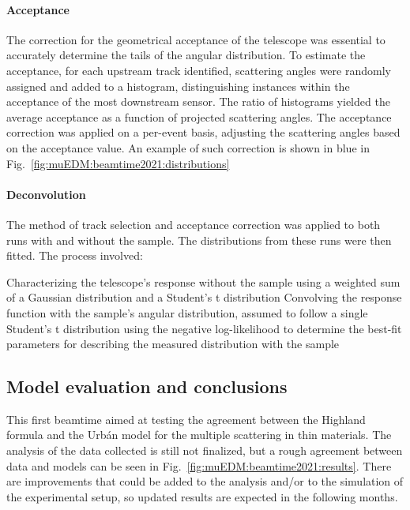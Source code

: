 \begin{refsection}
        \paragraph{Acceptance}
        The correction for the geometrical acceptance of the telescope was essential to accurately determine the tails of the angular distribution.
        To estimate the acceptance, for each upstream track identified, scattering angles were randomly assigned and added to a histogram, distinguishing instances within the acceptance of the most downstream sensor. 
        The ratio of histograms yielded the average acceptance as a function of projected scattering angles. 
        The acceptance correction was applied on a per-event basis, adjusting the scattering angles based on the acceptance value. 
        An example of such correction is shown in blue in Fig.~\ref{fig:muEDM:beamtime2021:distributions}
        
        \paragraph{Deconvolution}
        The method of track selection and acceptance correction was applied to both runs with and without the sample. 
        The distributions from these runs were then fitted.
        The process involved:
        \begin{outline}
            \1 Characterizing the telescope's response without the sample using a weighted sum of a Gaussian distribution and a Student's t distribution
            \1 Convolving the response function with the sample's angular distribution, assumed to follow a single Student's t distribution
            \1 using the negative log-likelihood to determine the best-fit parameters for describing the measured distribution with the sample
        \end{outline}
    
    \subsection{Model evaluation and conclusions}
        This first beamtime aimed at testing the agreement between the Highland formula and the \gf Urb\'{a}n model for the multiple scattering in thin materials.
        The analysis of the data collected is still not finalized, but a rough agreement between data and models can be seen in Fig.~\ref{fig:muEDM:beamtime2021:results}.
        There are improvements that could be added to the analysis and/or to the simulation of the experimental setup, so updated results are expected in the following months.
        

\end{refsection}
